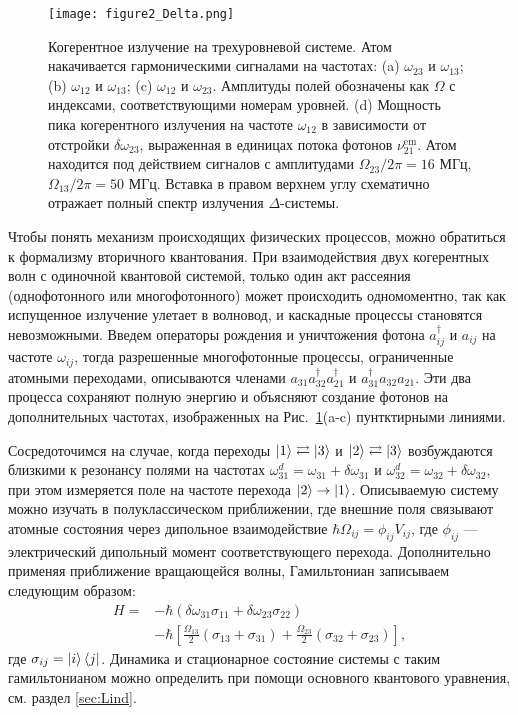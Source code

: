 \begin{figure}[!th]
	\centering
	\texttt{[image: figure2\_Delta.png]}
	\caption[Режимы трехволнового смешения на трехуровневой $\Delta$-системе]{Когерентное излучение на трехуровневой системе. Атом накачивается гармоническими сигналами на частотах: (a) $\omega_{23}$ и $\omega_{13}$; (b) $\omega_{12}$ и $\omega_{13}$; (c) $\omega_{12}$ и $\omega_{23}$. Амплитуды полей обозначены как $\Omega$ с индексами, соответствующими номерам уровней. (d) Мощность пика когерентного излучения на частоте $\omega_{12}$ в зависимости от отстройки $\delta\omega_{23}$, выраженная в единицах потока фотонов $\nu_{21}^{\text{em}}$. Атом находится под действием сигналов с амплитудами $\Omega_{23}/2\pi=16$ МГц, $\Omega_{13}/2\pi=50$ МГц. Вставка в правом верхнем углу схематично отражает полный спектр излучения $\Delta$-системы. }
	\label{fig: 3wm_regimes}
\end{figure}

Чтобы понять механизм происходящих физических процессов, можно обратиться к формализму вторичного квантования. При взаимодействия двух когерентных волн с одиночной квантовой системой, только один акт рассеяния (однофотонного или многофотонного) может происходить одномоментно, так как испущенное излучение улетает в волновод, и каскадные процессы становятся невозможными. Введем операторы рождения и уничтожения фотона  $a^{\dagger}_{ij} \text{ и }a_{ij}$ на частоте $\omega_{ij}$, тогда разрешенные многофотонные процессы, ограниченные атомными переходами, описываются членами $a_{31}a_{32}^{\dagger}a_{21}^{\dagger}$ и $a_{31}^{\dagger}a_{32}a_{21}$. Эти два процесса сохраняют полную энергию и объясняют создание фотонов на дополнительных частотах, изображенных на Рис.~\ref{fig: 3wm_regimes}(a-c) пунтктирными линиями.

Сосредоточимся на случае, когда переходы $\ket{1} \rightleftarrows \ket{3}$ и $\ket{2} \rightleftarrows \ket{3}$ возбуждаются близкими к резонансу полями на частотах $\omega_{31}^{d}=\omega_{31}+\delta\omega_{31}$ и $\omega_{32}^{d}=\omega_{32}+\delta\omega_{32}$, при этом измеряется поле на частоте перехода $\ket{2}\rightarrow\ket{1}$. Описываемую систему можно изучать в полуклассическом приближении, где внешние поля связывают атомные состояния через дипольное взаимодействие $\hbar\Omega_{ij}=\phi_{ij}V_{ij}$, где $\phi_{ij}$ --- электрический дипольный момент соответствующего перехода. Дополнительно применяя приближение вращающейся волны, Гамильтониан записываем следующим образом:
\begin{equation}
	\begin{aligned}
		H={}&-\hbar(\delta\omega_{31}\sigma_{11}+\delta\omega_{23}\sigma_{22})\\
		&-\hbar\left[\frac{\Omega_{13}}{2}(\sigma_{13}+\sigma_{31})+\frac{\Omega_{23}}{2}(\sigma_{32}+\sigma_{23})\right],
	\end{aligned}
	\label{}
\end{equation}
где $\sigma_{ij}=\ket{i}\bra{j}$. Динамика и стационарное состояние системы с таким гамильтонианом можно определить при помощи основного квантового уравнения, см. раздел \ref{sec:Lind}.

